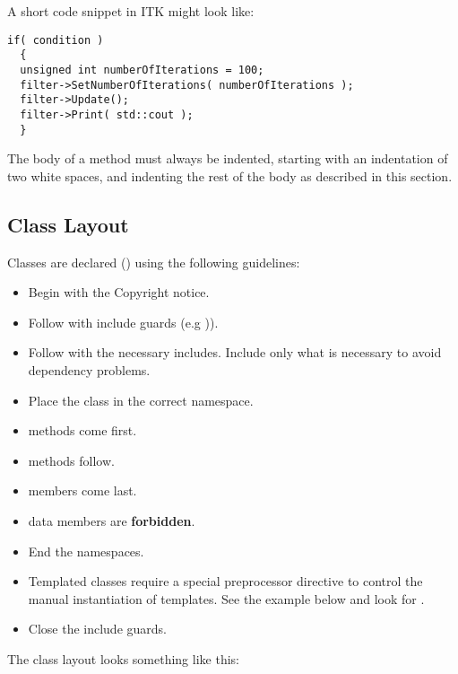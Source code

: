 A short code snippet in ITK might look like:

\small
\begin{verbatim}
if( condition )
  {
  unsigned int numberOfIterations = 100;
  filter->SetNumberOfIterations( numberOfIterations );
  filter->Update();
  filter->Print( std::cout );
  }
\end{verbatim}
\normalsize

The body of a method must always be indented, starting with an indentation of
two white spaces, and indenting the rest of the body as described in this
section.


\subsection{Class Layout}
\label{subsec:ClassLayout}

Classes are declared () using the following guidelines:
\begin{itemize}
\item Begin with the Copyright notice.
\item Follow with include guards (e.g )).
\item Follow with the necessary includes. Include only what is necessary to
avoid dependency problems.
\item Place the class in the correct namespace.
\item {} methods come first.
\item {} methods follow.
\item {} members come last.
\item {} data members are \textbf{forbidden}.
\item End the namespaces.
\item Templated classes require a special preprocessor directive to control the
manual instantiation of templates. See the example below and look for
.
\item Close the include guards.
\end{itemize}

The class layout looks something like this:

